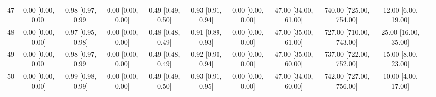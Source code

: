 \documentclass[8pt]{article}
\begin{document}
\begin{center}
\begin{footnotesize}
\begin{longtable}{|ccccccccccc|}
 47 &  0.00 [0.00, 0.00] &  0.98 [0.97, 0.99] &  0.00 [0.00, 0.00] &  0.49 [0.49, 0.50] &  0.93 [0.91, 0.94] &     0.00 [0.00, 0.00] &  47.00 [34.00, 61.00] &  740.00 [725.00, 754.00] &      12.00 [6.00, 19.00] \\
 48 &  0.00 [0.00, 0.00] &  0.97 [0.95, 0.98] &  0.00 [0.00, 0.00] &  0.48 [0.48, 0.49] &  0.91 [0.89, 0.93] &     0.00 [0.00, 0.00] &  47.00 [35.00, 61.00] &  727.00 [710.00, 743.00] &     25.00 [16.00, 35.00] \\
 49 &  0.00 [0.00, 0.00] &  0.98 [0.97, 0.99] &  0.00 [0.00, 0.00] &  0.49 [0.48, 0.49] &  0.92 [0.90, 0.94] &     0.00 [0.00, 0.00] &  47.00 [35.00, 60.00] &  737.00 [722.00, 752.00] &      15.00 [8.00, 23.00] \\
 50 &  0.00 [0.00, 0.00] &  0.99 [0.98, 0.99] &  0.00 [0.00, 0.00] &  0.49 [0.49, 0.50] &  0.93 [0.91, 0.95] &     0.00 [0.00, 0.00] &  47.00 [34.00, 60.00] &  742.00 [727.00, 756.00] &      10.00 [4.00, 17.00] \\
\end{longtable}
\end{footnotesize}
\end{center}
\end{document}
